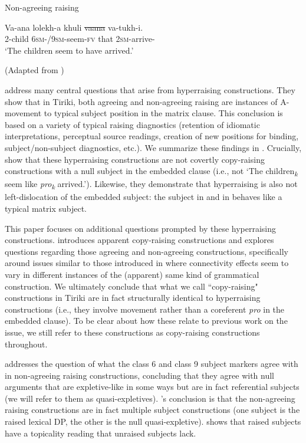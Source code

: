 \documentclass[output=paper,colorlinks,citecolor=brown
]{langscibook}
\begin{document}
\ea \label{ex:johnson:IntroNonAgrRaising}{{Non-agreeing raising}}

\gll Va-ana lolekh-a khuli \sout{vaana} va-tukh-i.\\
2-child \textsc{6sm-/9sm-}seem-\textsc{fv} that {} \textsc{2sm}-arrive-\Pst{}\\
\glt `The children seem to have arrived.'

(Adapted from \citealt[98]{diercksetal2022luyia})
\z 

\citet{diercksetal2022luyia} address many central questions that arise from hyperraising constructions. They show that in Tiriki, both agreeing and non-agreeing raising are instances of A-movement to typical subject position in the matrix clause. This conclusion is based on a variety of typical raising diagnostics (retention of idiomatic interpretations, perceptual source readings, creation of new positions for binding, subject/non-subject diagnostics, etc.). We summarize these findings in . Crucially, \citet{diercksetal2022luyia} show that these hyperraising constructions are not covertly copy-raising constructions with a null subject in the embedded clause (i.e., not `The children\textsubscript{\textit{k}} seem like \textit{pro}\textsubscript{\textit{k}} arrived.'). Likewise, they demonstrate that hyperraising is also not left-dislocation of the embedded subject: the subject in  and in  behaves like a typical matrix subject. 

This paper focuses on additional questions prompted by these hyperraising constructions.  introduces apparent copy-raising constructions and explores questions regarding those agreeing and non-agreeing constructions, specifically around issues similar to those introduced in  where connectivity effects seem to vary in different instances of the (apparent) same kind of grammatical construction. We ultimately conclude that what we call ``copy-raising" constructions in Tiriki are in fact structurally identical to hyperraising constructions (i.e., they involve movement rather than a coreferent \textit{pro} in the embedded clause). To be clear about how these relate to previous work on the issue, we still refer to these constructions as copy-raising constructions throughout.

 addresses the question of what the class 6 and class 9 subject markers agree with in non-agreeing raising constructions, concluding that they agree with null arguments that are expletive-like in some ways but are in fact referential subjects (we will refer to them as quasi-expletives). 's conclusion is that the non-agreeing raising constructions are in fact multiple subject constructions (one subject is the raised lexical DP, the other is the null quasi-expletive).  shows that raised subjects have a topicality reading that unraised subjects lack. 
\end{document}

